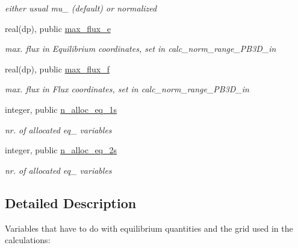\begin{DoxyCompactItemize}
\begin{DoxyCompactList}\small\item\em either usual mu\+\_ (default) or normalized \end{DoxyCompactList}\item 
real(dp), public \hyperlink{namespaceeq__vars_a863feef76ae60309d2e3ed4eed6bd436}{max\+\_\+flux\+\_\+e}
\begin{DoxyCompactList}\small\item\em max. flux in Equilibrium coordinates, set in calc\+\_\+norm\+\_\+range\+\_\+\+P\+B3\+D\+\_\+in \end{DoxyCompactList}\item 
real(dp), public \hyperlink{namespaceeq__vars_a46c97bf2a6d6eca952ca5173fcf9cdcb}{max\+\_\+flux\+\_\+f}
\begin{DoxyCompactList}\small\item\em max. flux in Flux coordinates, set in calc\+\_\+norm\+\_\+range\+\_\+\+P\+B3\+D\+\_\+in \end{DoxyCompactList}\item 
integer, public \hyperlink{namespaceeq__vars_aed1853ac20f0da0be39ab8ef82993c4d}{n\+\_\+alloc\+\_\+eq\+\_\+1s}
\begin{DoxyCompactList}\small\item\em nr. of allocated {\ttfamily eq\+\_} variables \end{DoxyCompactList}\item 
integer, public \hyperlink{namespaceeq__vars_af75297445b32de13371da989074dd454}{n\+\_\+alloc\+\_\+eq\+\_\+2s}
\begin{DoxyCompactList}\small\item\em nr. of allocated {\ttfamily eq\+\_} variables \end{DoxyCompactList}\end{DoxyCompactItemize}


\subsection{Detailed Description}
Variables that have to do with equilibrium quantities and the grid used in the calculations\+: 


